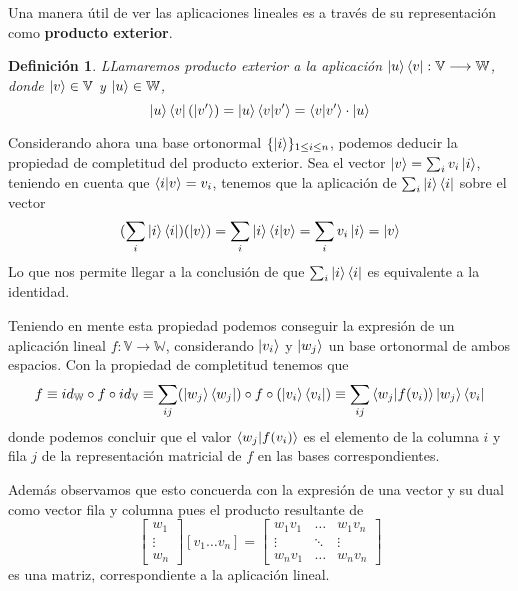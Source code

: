 \documentclass[a4paper]{article}
\newtheorem{deff}{Definición}[section]
\numberwithin{equation}{section}
\begin{document}
Una manera útil de ver las aplicaciones lineales es a través de su representación como \textbf{producto exterior}.

\begin{deff}LLamaremos producto exterior a la aplicación $\ket{u}\bra{v}: \mathbb{V} \longrightarrow \mathbb{W}$, donde $\ket{v} \in \mathbb{V}$ y $\ket{u} \in \mathbb{W}$,
\begin{equation}
\ket{u}\bra{v}(\ket{v'}) = \ket{u}\braket{v|v'} = \braket{v|v'} \cdot \ket{u}
\end{equation}
\end{deff}

Considerando ahora una base ortonormal $\{\ket{i}\}_{1\leq i\leq n}$, podemos deducir la propiedad de completitud del producto exterior. Sea el vector $\ket{v} = \sum_i v_i\ket{i}$, teniendo en cuenta que $\braket{i|v} = v_i$, tenemos que la aplicación de $\sum_i \ket{i}\bra{i}$ sobre el vector
\begin{equation}
(\sum_i \ket{i}\bra{i}) (\ket{v}) = \sum_i \ket{i}\braket{i|v} = \sum_i v_i \ket{i} = \ket{v}
\end{equation}
Lo que nos permite llegar a la conclusión de que $\sum_i \ket{i}\bra{i}$ es equivalente a la identidad.

Teniendo en mente esta propiedad podemos conseguir la expresión de un aplicación lineal $f: \mathbb{V} \longrightarrow \mathbb{W}$, considerando $\ket{v_i}$ y $\ket{w_j}$ un base ortonormal de ambos espacios. Con la propiedad de completitud tenemos que
\begin{equation}
f \equiv id_{\mathbb{W}} \circ f \circ id_{\mathbb{V}} \equiv
\sum_{ij} (\ket{w_j}\bra{w_j}) \circ f \circ (\ket{v_i}\bra{v_i}) \equiv \sum_{ij} \braket{w_j|f(v_i)} \ket{w_j}\bra{v_i}
\end{equation}
donde podemos concluir que el valor $\braket{w_j|f(v_i)}$ es el elemento de la columna $i$ y fila $j$ de la representación matricial de $f$ en las bases correspondientes.

Además observamos que esto concuerda con la expresión de una vector y su dual como vector fila y columna pues el producto resultante de
\begin{equation}
\begin{bmatrix}
w_1 \\ \vdots \\ w_n
\end{bmatrix}
\left[ v_1 \ldots v_n \right]
= \begin{bmatrix}
w_1 v_1 & \ldots & w_1 v_n \\
\vdots & \ddots & \vdots \\
w_n v_1 & \ldots & w_n v_n
\end{bmatrix}
\end{equation} es una matriz, correspondiente a la aplicación lineal.
\end{document}
